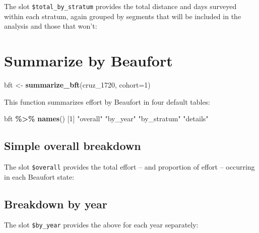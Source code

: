 \documentclass[
]{book}
\newenvironment{Shaded}{\begin{snugshade}}{\end{snugshade}}
\newcommand{\AttributeTok}[1]{\textcolor[rgb]{0.13,0.29,0.53}{#1}}
\newcommand{\DecValTok}[1]{\textcolor[rgb]{0.00,0.00,0.81}{#1}}
\newcommand{\FunctionTok}[1]{\textcolor[rgb]{0.13,0.29,0.53}{\textbf{#1}}}
\newcommand{\NormalTok}[1]{#1}
\newcommand{\OtherTok}[1]{\textcolor[rgb]{0.56,0.35,0.01}{#1}}
\newcommand{\SpecialCharTok}[1]{\textcolor[rgb]{0.81,0.36,0.00}{\textbf{#1}}}
\newcommand{\StringTok}[1]{\textcolor[rgb]{0.31,0.60,0.02}{#1}}
\begin{document}
The slot \texttt{\$total\_by\_stratum} provides the total distance and days surveyed within each stratum, again grouped by segments that will be included in the analysis and those that won't:

\hypertarget{summarize-by-beaufort}{%
\section*{Summarize by Beaufort}\label{summarize-by-beaufort}}

\begin{Shaded}
\begin{Highlighting}[]
\NormalTok{bft }\OtherTok{\textless{}{-}} \FunctionTok{summarize\_bft}\NormalTok{(cruz\_1720, }\AttributeTok{cohort=}\DecValTok{1}\NormalTok{)}
\end{Highlighting}
\end{Shaded}

This function summarizes effort by Beaufort in four default tables:

\begin{Shaded}
\begin{Highlighting}[]
\NormalTok{bft }\SpecialCharTok{\%\textgreater{}\%}  \FunctionTok{names}\NormalTok{()}
\NormalTok{[}\DecValTok{1}\NormalTok{] }\StringTok{"overall"}    \StringTok{"by\_year"}    \StringTok{"by\_stratum"} \StringTok{"details"}   
\end{Highlighting}
\end{Shaded}

\hypertarget{simple-overall-breakdown}{%
\subsection*{Simple overall breakdown}\label{simple-overall-breakdown}}

The slot \texttt{\$overall} provides the total effort -- and proportion of effort -- occurring in each Beaufort state:

\hypertarget{breakdown-by-year}{%
\subsection*{Breakdown by year}\label{breakdown-by-year}}

The slot \texttt{\$by\_year} provides the above for each year separately:
\end{document}
